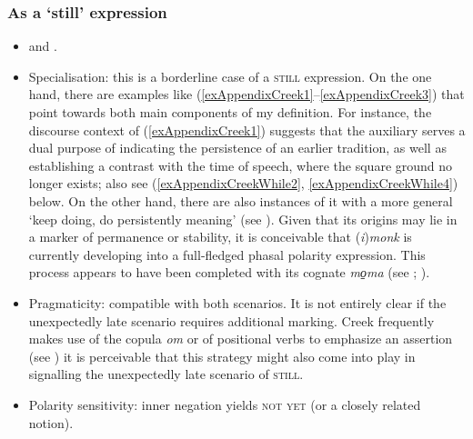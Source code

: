 \subsubsection{As a \lq{}still\rq{ }expression}\label{appendixCreekStill}
\begin{itemize}
	\item \textcite[306–307]{Martin2011} and \textcite[25]{MartinMcKaneMauldin2000}.
	\item Specialisation: this is a borderline case of a \textsc{still} expression. On the one hand, there are examples like (\ref{exAppendixCreek1}–\ref{exAppendixCreek3}) that point towards both main components of my definition. For instance, the discourse context of (\ref{exAppendixCreek1}) suggests that the auxiliary serves a dual purpose of indicating the persistence of an earlier tradition, as well as establishing a contrast with the time of speech, where the square ground no longer exists; also see (\ref{exAppendixCreekWhile2}, \ref{exAppendixCreekWhile4}) below. On the other hand, there are also instances of it with a more general \lq keep doing, do persistently meaning\rq{ }(see ). Given that its origins may lie in a marker of permanence or stability, it is conceivable that \mbox{(\textit{i})\textit{monk}} is currently developing into a full-fledged phasal polarity expression. This process appears to have been completed with its  cognate \textit{mo̠ma} (see \cite[316–317]{Broadwell2006}; \cite[120]{ChochtawDictionary}).
\item Pragmaticity: compatible with both scenarios. It is not entirely clear if the unexpectedly late scenario requires additional marking. Creek frequently makes use of the copula \textit{om} or of positional verbs to emphasize an assertion (see \cite[ch. 32]{Martin2011}) \textendash{ }it is perceivable that this strategy might also come into play in signalling the unexpectedly late scenario of \textsc{still}.
\item Polarity sensitivity: inner negation yields \textsc{not yet} (or a closely related notion).
\end{itemize}
